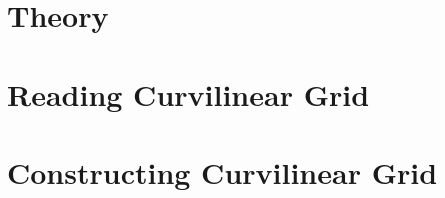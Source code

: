\documentclass[a4paper,11pt]{article}
\begin{document}






\section{Theory}













\pagebreak
\section{Reading Curvilinear Grid}




\pagebreak
\section{Constructing Curvilinear Grid}
\label{impl-grid-constructor}



\end{document}
